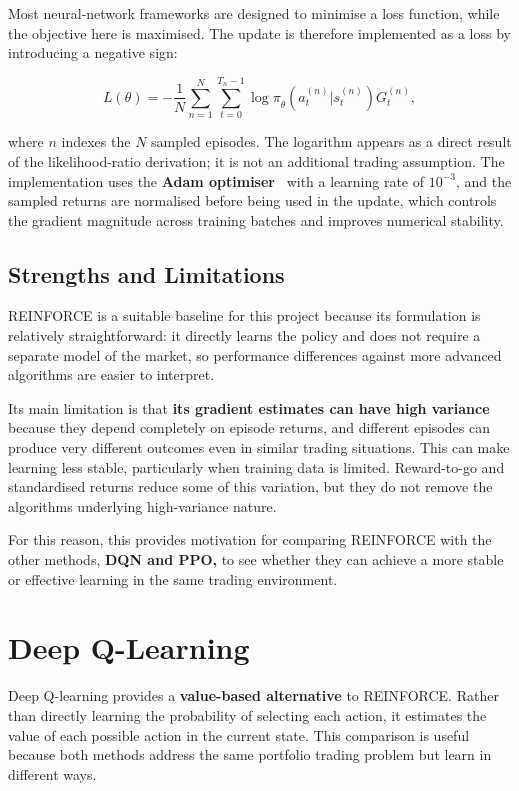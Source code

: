 Most neural-network frameworks are designed to minimise a loss function,
while the objective here is maximised. The update is therefore
implemented as a loss by introducing a negative sign:

\[L(\theta) = - \frac{1}{N}\sum_{n = 1}^{N}{\sum_{t = 0}^{T_{n} - 1}{\log\pi}_{\theta}}\left( a_{t}^{(n)}|s_{t}^{(n)} \right)G_{t}^{(n)},\]

where \(n\) indexes the \(N\) sampled episodes. The logarithm appears as
a direct result of the likelihood-ratio derivation; it is not an
additional trading assumption. The implementation uses the \textbf{Adam
optimiser}~\cite{kingma2015adam} with a learning rate of \(10^{-3}\),
and the sampled returns are normalised before being used in the update,
which controls the gradient magnitude across training batches and
improves numerical stability.

\subsection{Strengths and Limitations}

REINFORCE is a suitable baseline for this project because its
formulation is relatively straightforward: it directly learns the
policy and does not require a separate model of the market, so
performance differences against more advanced algorithms are easier to
interpret.

Its main limitation is that \textbf{its gradient estimates can have high
variance} because they depend completely on episode returns, and
different episodes can produce very different outcomes even in similar
trading situations. This can make learning less stable, particularly
when training data is limited. Reward-to-go and standardised returns
reduce some of this variation, but they do not remove the
algorithm\textquotesingle s underlying high-variance nature.

For this reason, this provides motivation for comparing REINFORCE with
the other methods, \textbf{DQN and PPO,} to see whether they can achieve
a more stable or effective learning in the same trading environment.

\section{Deep Q-Learning}

Deep Q-learning provides a \textbf{value-based alternative} to
REINFORCE. Rather than directly learning the probability of selecting
each action, it estimates the value of each possible action in the
current state. This comparison is useful because both methods address
the same portfolio trading problem but learn in different ways.

